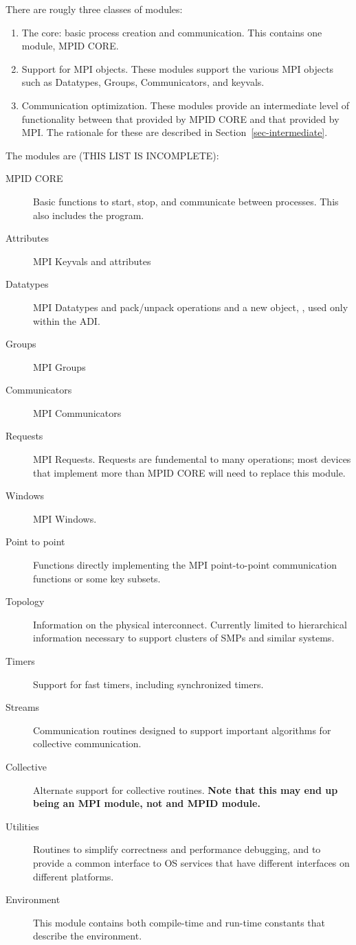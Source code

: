 \documentclass{article}
\begin{document}
There are rougly three classes of modules:
\begin{enumerate}
\item The core: basic process creation and communication. This
contains one module, MPID CORE. 
\item Support for MPI objects.  These modules support the various MPI
objects such as Datatypes, Groups, Communicators, and keyvals.
\item Communication optimization.  These modules provide an
intermediate level of functionality between that provided by MPID CORE
and that provided by MPI.  The rationale for these are described in
Section~\ref{sec-intermediate}. 
\end{enumerate}

The modules are (THIS LIST IS INCOMPLETE):
\begin{description}
\item[MPID CORE]Basic functions to start, stop, and communicate
between processes.  This also includes the  program.
\item[Attributes]MPI Keyvals and attributes
\item[Datatypes]MPI Datatypes and pack/unpack operations and a new
object, , used only within the ADI.
\item[Groups]MPI Groups
\item[Communicators]MPI Communicators
\item[Requests]MPI Requests.  Requests are fundemental to many
operations; most devices that implement more than MPID CORE will need
to replace this module.
\item[Windows]MPI Windows.
\item[Point to point]Functions directly implementing the MPI
point-to-point communication functions or some key subsets.
\item[Topology]Information on the physical interconnect.  Currently
limited to hierarchical information necessary to support clusters of
SMPs and similar systems.
\item[Timers]Support for fast timers, including synchronized timers.
\item[Streams]Communication routines designed to support
important algorithms for collective communication.
\item[Collective]Alternate support for collective
routines. \textbf{Note that this may end up being an MPI module, not
and MPID module.}
\item[Utilities]Routines to simplify correctness and performance
debugging, and to provide a common interface to OS services that have
different interfaces on different platforms.
\item[Environment]This module contains both compile-time and run-time
constants that describe the environment. 
\end{description}
\end{document}
